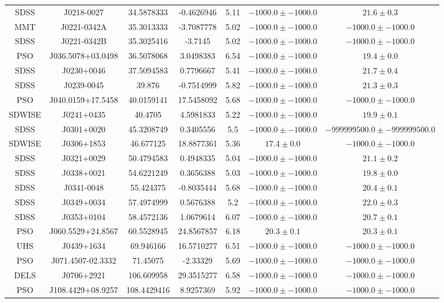 \begin{table}
\begin{tabular}{ccccccc}
SDSS & J0218-0027 & 34.5878333 & -0.4626946 & 5.11 & $-1000.0\pm-1000.0$ & $  21.6\pm  0.3$ \\
MMT & J0221-0342A & 35.3013333 & -3.7087778 & 5.02 & $-1000.0\pm-1000.0$ & $-1000.0\pm-1000.0$ \\
SDSS & J0221-0342B & 35.3025416 & -3.7145 & 5.02 & $-1000.0\pm-1000.0$ & $-1000.0\pm-1000.0$ \\
PSO & J036.5078+03.0498 & 36.5078068 & 3.0498383 & 6.54 & $-1000.0\pm-1000.0$ & $  19.4\pm  0.0$ \\
SDSS & J0230+0046 & 37.5094583 & 0.7796667 & 5.41 & $-1000.0\pm-1000.0$ & $  21.7\pm  0.4$ \\
SDSS & J0239-0045 & 39.876 & -0.7514999 & 5.82 & $-1000.0\pm-1000.0$ & $  21.3\pm  0.3$ \\
PSO & J040.0159+17.5458 & 40.0159141 & 17.5458092 & 5.68 & $-1000.0\pm-1000.0$ & $-1000.0\pm-1000.0$ \\
SDWISE & J0241+0435 & 40.4705 & 4.5981833 & 5.22 & $-1000.0\pm-1000.0$ & $  19.9\pm  0.1$ \\
SDSS & J0301+0020 & 45.3208749 & 0.3405556 & 5.5 & $-1000.0\pm-1000.0$ & $-999999500.0\pm-999999500.0$ \\
SDWISE & J0306+1853 & 46.677125 & 18.8877361 & 5.36 & $  17.4\pm  0.0$ & $-1000.0\pm-1000.0$ \\
SDSS & J0321+0029 & 50.4794583 & 0.4948335 & 5.04 & $-1000.0\pm-1000.0$ & $  21.1\pm  0.2$ \\
SDSS & J0338+0021 & 54.6221249 & 0.3656388 & 5.03 & $-1000.0\pm-1000.0$ & $  19.8\pm  0.0$ \\
SDSS & J0341-0048 & 55.424375 & -0.8035444 & 5.68 & $-1000.0\pm-1000.0$ & $  20.4\pm  0.1$ \\
SDSS & J0349+0034 & 57.4974999 & 0.5676388 & 5.2 & $-1000.0\pm-1000.0$ & $  22.0\pm  0.3$ \\
SDSS & J0353+0104 & 58.4572136 & 1.0679614 & 6.07 & $-1000.0\pm-1000.0$ & $  20.7\pm  0.1$ \\
PSO & J060.5529+24.8567 & 60.5528945 & 24.8567857 & 6.18 & $  20.3\pm  0.1$ & $  20.3\pm  0.1$ \\
UHS & J0439+1634 & 69.946166 & 16.5710277 & 6.51 & $-1000.0\pm-1000.0$ & $-1000.0\pm-1000.0$ \\
PSO & J071.4507-02.3332 & 71.45075 & -2.33329 & 5.69 & $-1000.0\pm-1000.0$ & $-1000.0\pm-1000.0$ \\
DELS & J0706+2921 & 106.609958 & 29.3515277 & 6.58 & $-1000.0\pm-1000.0$ & $-1000.0\pm-1000.0$ \\
PSO & J108.4429+08.9257 & 108.4429416 & 8.9257369 & 5.92 & $-1000.0\pm-1000.0$ & $-1000.0\pm-1000.0$ \\

\end{tabular}
\end{table}
